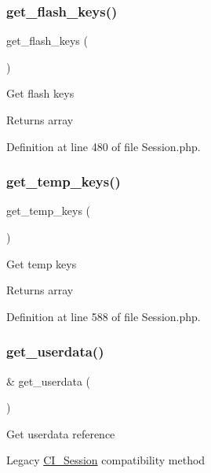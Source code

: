 \subsubsection{\texorpdfstring{get\_flash\_keys()}{get\_flash\_keys()}}
{\footnotesize\ttfamily get\+\_\+flash\+\_\+keys (\begin{DoxyParamCaption}{ }\end{DoxyParamCaption})}

Get flash keys

\begin{DoxyReturn}{Returns}
array 
\end{DoxyReturn}


Definition at line 480 of file Session.\+php.

\mbox{\label{class_c_i___session_a4fd9f48ff9bcf093778529cb7389eddb}} 
\subsubsection{\texorpdfstring{get\_temp\_keys()}{get\_temp\_keys()}}
{\footnotesize\ttfamily get\+\_\+temp\+\_\+keys (\begin{DoxyParamCaption}{ }\end{DoxyParamCaption})}

Get temp keys

\begin{DoxyReturn}{Returns}
array 
\end{DoxyReturn}


Definition at line 588 of file Session.\+php.

\mbox{\label{class_c_i___session_a85456fcd9f556e20767051fc33762607}} 
\subsubsection{\texorpdfstring{get\_userdata()}{get\_userdata()}}
{\footnotesize\ttfamily \& get\+\_\+userdata (\begin{DoxyParamCaption}{ }\end{DoxyParamCaption})}

Get userdata reference

Legacy \mbox{\hyperlink{class_c_i___session}{C\+I\+\_\+\+Session}} compatibility method

